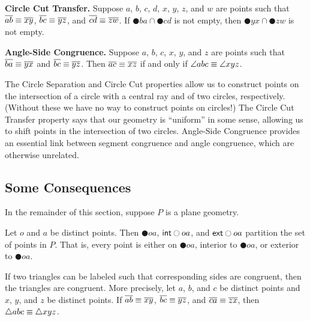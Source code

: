 \begin{dfn}
\begin{proplist}
\item \textbf{Circle Cut Transfer.} Suppose \(a\), \(b\), \(c\), \(d\), \(x\), \(y\), \(z\), and \(w\) are points such that \(\overline{ab} \equiv \overline{xy}\), \(\overline{bc} \equiv \overline{yz}\), and \(\overline{cd} \equiv \overline{zw}\). If \(\CIRCLE{b}{a} \cap \CIRCLE{c}{d}\) is not empty, then \(\CIRCLE{y}{x} \cap \CIRCLE{z}{w}\) is not empty.

\item \textbf{Angle-Side Congruence.} Suppose \(a\), \(b\), \(c\), \(x\), \(y\), and \(z\) are points such that \(\overline{ba} \equiv \overline{yx}\) and \(\overline{bc} \equiv \overline{yz}\). Then \(\overline{ac} \equiv \overline{xz}\) if and only if \(\angle{abc} \equiv \angle{xyz}\).
\end{proplist}
\end{dfn}

The Circle Separation and Circle Cut properties allow us to construct points on the intersection of a circle with a central ray and of two circles, respectively. (Without these we have no way to construct points on circles!) The Circle Cut Transfer property says that our geometry is ``uniform'' in some sense, allowing us to shift points in the intersection of two circles. Angle-Side Congruence provides an essential link between segment congruence and angle congruence, which are otherwise unrelated.

\subsection*{Some Consequences}

In the remainder of this section, suppose \(P\) is a plane geometry.

\begin{prop}
Let \(o\) and \(a\) be distinct points. Then \(\CIRCLE{o}{a}\), \(\mathsf{int}\ocircle{oa}\), and \(\mathsf{ext}\ocircle{oa}\) partition the set of points in \(P\). That is, every point is either on \(\CIRCLE{o}{a}\), interior to \(\CIRCLE{o}{a}\), or exterior to \(\CIRCLE{o}{a}\).
\end{prop}

\begin{prop}
If two triangles can be labeled such that corresponding sides are congruent, then the triangles are congruent. More precisely, let \(a\), \(b\), and \(c\) be distinct points and \(x\), \(y\), and \(z\) be distinct points. If \(\overline{ab} \equiv \overline{xy}\), \(\overline{bc} \equiv \overline{yz}\), and \(\overline{ca} \equiv \overline{zx}\), then \(\bigtriangleup{abc} \equiv \bigtriangleup{xyz}\).
\end{prop}

